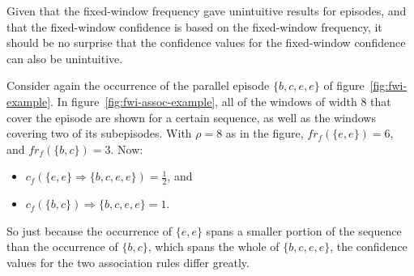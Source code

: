 Given that the fixed-window frequency gave unintuitive results for episodes, and that the fixed-window confidence is based on the fixed-window frequency, it should be no surprise that the confidence values for the fixed-window confidence can also be unintuitive.

Consider again the occurrence of the parallel episode $ \{ b, c, e, e \} $ of figure~\ref{fig:fwi-example}. In figure~\ref{fig:fwi-assoc-example}, all of the windows of width $ 8 $ that cover the episode are shown for a certain sequence, as well as the windows covering two of its subepisodes. With $ \rho = 8 $ as in the figure, $ fr_f(\{ e, e \}) = 6 $, and $ fr_f(\{ b, c \}) = 3 $. Now:
\begin{itemize}
\item $ c_f(\{ e, e \} \Rightarrow \{ b, c, e, e \}) = \frac12 $, and
\item $ c_f(\{ b, c \}) \Rightarrow \{ b, c, e, e \} = 1 $.
\end{itemize}

So just because the occurrence of $ \{ e, e \} $ spans a smaller portion of the sequence than the occurrence of $ \{ b, c \} $, which spans the whole of $ \{ b, c, e, e \} $, the confidence values for the two association rules differ greatly.

